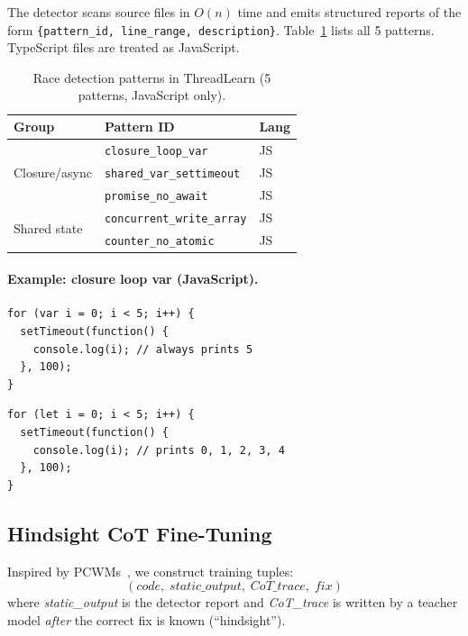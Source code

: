 \documentclass[11pt]{article}
\begin{document}
The detector scans source files in $O(n)$ time and emits structured reports of
the form \texttt{\{pattern\_id, line\_range, description\}}.
Table~\ref{tab:patterns} lists all 5 patterns.
TypeScript files are treated as JavaScript.

\begin{table}[ht]
  \centering
  \caption{Race detection patterns in ThreadLearn (5 patterns, JavaScript only).}
  \label{tab:patterns}
  \begin{tabular}{@{}lll@{}}
    \toprule
    \textbf{Group} & \textbf{Pattern ID} & \textbf{Lang} \\
    \midrule
    \multirow{3}{*}{Closure/async}
      & \texttt{closure\_loop\_var}       & JS \\
      & \texttt{shared\_var\_settimeout}  & JS \\
      & \texttt{promise\_no\_await}       & JS \\
    \midrule
    \multirow{2}{*}{Shared state}
      & \texttt{concurrent\_write\_array} & JS \\
      & \texttt{counter\_no\_atomic}      & JS \\
    \bottomrule
  \end{tabular}
\end{table}

\paragraph{Example: closure loop var (JavaScript).}

\begin{lstlisting}[style=js, caption={Buggy: \texttt{var i} captured by reference.}]
for (var i = 0; i < 5; i++) {
  setTimeout(function() {
    console.log(i); // always prints 5
  }, 100);
}
\end{lstlisting}

\begin{lstlisting}[style=js, caption={Fixed: \texttt{let i} creates per-iteration binding.}]
for (let i = 0; i < 5; i++) {
  setTimeout(function() {
    console.log(i); // prints 0, 1, 2, 3, 4
  }, 100);
}
\end{lstlisting}


\subsection{Hindsight CoT Fine-Tuning}
\label{sec:design:finetuning}

Inspired by PCWMs~\cite{pcwms2026}, we construct training tuples:
\[
  (\textit{code},\; \textit{static\_output},\; \textit{CoT\_trace},\; \textit{fix})
\]
where \textit{static\_output} is the detector report and \textit{CoT\_trace}
is written by a teacher model \emph{after} the correct fix is known (``hindsight'').
\end{document}
